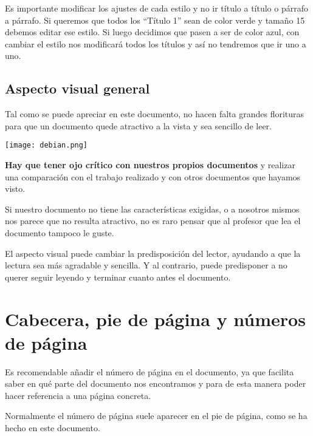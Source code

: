 Es importante modificar los ajustes de cada estilo y no ir título a título o párrafo a párrafo. Si queremos que todos los “Título 1” sean de color verde y tamaño 15 debemos editar ese estilo. Si luego decidimos que pasen a ser de color azul, con cambiar el estilo nos modificará todos los títulos y así no tendremos que ir uno a uno.

\vspace{10pt}

\subsection{Aspecto visual general}
Tal como se puede apreciar en este documento, no hacen falta grandes florituras para que un documento quede atractivo a la vista y sea sencillo de leer.


\begin{minipage}{0.19\linewidth}
    \texttt{[image: debian.png]}
\end{minipage}
\hfill
\begin{minipage}{0.8\linewidth}
    \setlength{\parskip}{1.2em}
    \renewcommand{\baselinestretch}{1.4}
\textbf{Hay que tener ojo crítico con nuestros propios documentos} y realizar una comparación con el trabajo realizado y con otros documentos que hayamos visto.


Si nuestro documento no tiene las características exigidas, o a nosotros mismos nos parece que no resulta atractivo, no es raro pensar que al profesor que lea el documento tampoco le guste.
\end{minipage}

El aspecto visual puede cambiar la predisposición del lector, ayudando a que la lectura sea más agradable y sencilla. Y al contrario, puede predisponer a no querer seguir leyendo y terminar cuanto antes el documento.

\section{Cabecera, pie de página y números de página}
Es recomendable añadir el número de página en el documento, ya que facilita saber en qué parte del documento nos encontramos y para de esta manera poder hacer referencia a una página concreta.

Normalmente el número de página suele aparecer en el pie de página, como se ha hecho en este documento.

